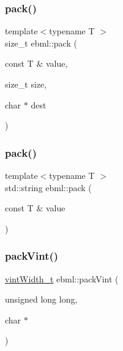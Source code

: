 \subsubsection{\texorpdfstring{pack()}{pack()}\hspace{0.1cm}{\footnotesize\ttfamily [23/24]}}
{\footnotesize\ttfamily template$<$typename T $>$ \\
size\+\_\+t ebml\+::pack (\begin{DoxyParamCaption}\item[{const T \&}]{value,  }\item[{size\+\_\+t}]{size,  }\item[{char $\ast$}]{dest }\end{DoxyParamCaption})}

\mbox{\label{namespaceebml_a8cf030e141b95cd742c465794a8faf02}} 
\subsubsection{\texorpdfstring{pack()}{pack()}\hspace{0.1cm}{\footnotesize\ttfamily [24/24]}}
{\footnotesize\ttfamily template$<$typename T $>$ \\
std\+::string ebml\+::pack (\begin{DoxyParamCaption}\item[{const T \&}]{value }\end{DoxyParamCaption})}

\mbox{\label{namespaceebml_a0ccc1293a99e95cd38a5125cb7d15361}} 
\subsubsection{\texorpdfstring{pack\+Vint()}{packVint()}\hspace{0.1cm}{\footnotesize\ttfamily [1/2]}}
{\footnotesize\ttfamily \mbox{\hyperlink{namespaceebml_a2ccdfb60b23efb51fe07f9d066e23604}{vint\+Width\+\_\+t}} ebml\+::pack\+Vint (\begin{DoxyParamCaption}\item[{unsigned long}]{long,  }\item[{char $\ast$}]{ }\end{DoxyParamCaption})}

\mbox{\label{namespaceebml_ab96b36c3bf5bae473a35bec372103006}} 
